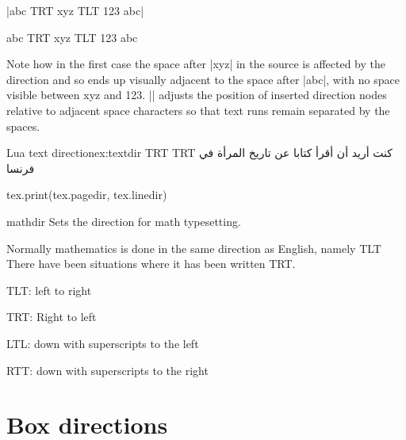 |abc {\linedir TRT xyz \linedir TLT 123} abc|

abc {\linedir TRT xyz \linedir TLT 123} abc


Note how in the first case the space after |xyz| in the source
is affected by the direction and so ends up visually adjacent to the
space after |abc|, with no space visible between xyz and 123.
|\linedir| adjusts the position of inserted direction nodes relative
to adjacent space characters so that text runs remain separated by the
spaces.


\begin{texexample}{Lua text direction}{ex:textdir}
\bgroup
\panunicode
\linedir TRT
\pardir TRT
كنت أريد أن أقرأ كتابا عن تاريخ المرأة في فرنسا‬

\begin{luacode*}
  tex.print(tex.pagedir, tex.linedir)
    
\end{luacode*}
\egroup
\end{texexample}

\begin{docCommand}{mathdir}{}
Sets the direction for math typesetting.
\end{docCommand}
Normally mathematics is done in the same direction as English, namely
TLT There have been situations where it has been written TRT.

TLT: left to right\par
TRT: Right to left\par
LTL: down with superscripts to the left\par
RTT: down with superscripts to the right\par



\section{Box directions}

